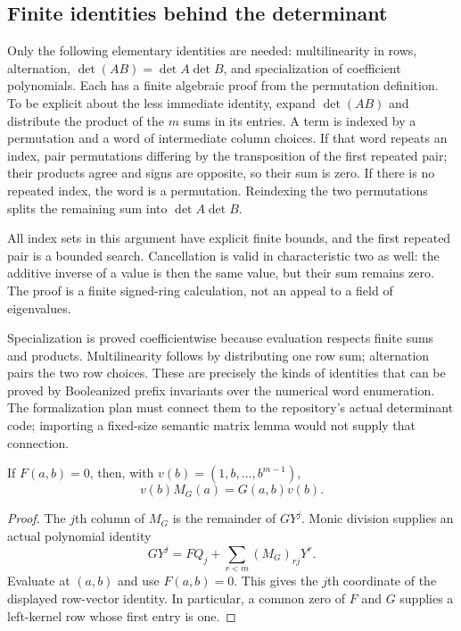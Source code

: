 \subsection{Finite identities behind the determinant}

Only the following elementary identities are needed: multilinearity in rows, alternation, $\det(AB)=\det A\det B$, and specialization of coefficient polynomials. Each has a finite algebraic proof from the permutation definition. To be explicit about the less immediate identity, expand $\det(AB)$ and distribute the product of the $m$ sums in its entries. A term is indexed by a permutation and a word of intermediate column choices. If that word repeats an index, pair permutations differing by the transposition of the first repeated pair; their products agree and signs are opposite, so their sum is zero. If there is no repeated index, the word is a permutation. Reindexing the two permutations splits the remaining sum into $\det A\det B$.

All index sets in this argument have explicit finite bounds, and the first repeated pair is a bounded search. Cancellation is valid in characteristic two as well: the additive inverse of a value is then the same value, but their sum remains zero. The proof is a finite signed-ring calculation, not an appeal to a field of eigenvalues.

Specialization is proved coefficientwise because evaluation respects finite sums and products. Multilinearity follows by distributing one row sum; alternation pairs the two row choices. These are precisely the kinds of identities that can be proved by Booleanized prefix invariants over the numerical word enumeration. The formalization plan must connect them to the repository's actual determinant code; importing a fixed-size semantic matrix lemma would not supply that connection.

\begin{lemma}\label{lem:evaluation-action}
If $F(a,b)=0$, then, with $v(b)=(1,b,\ldots,b^{m-1})$,
\[
 v(b)M_G(a)=G(a,b)v(b).
\]
\end{lemma}
\begin{proof}
The $j$th column of $M_G$ is the remainder of $GY^j$. Monic division supplies an actual polynomial identity
\[
 GY^j=FQ_j+\sum_{r<m}(M_G)_{rj}Y^r.
\]
Evaluate at $(a,b)$ and use $F(a,b)=0$. This gives the $j$th coordinate of the displayed row-vector identity. In particular, a common zero of $F$ and $G$ supplies a left-kernel row whose first entry is one.
\end{proof}

